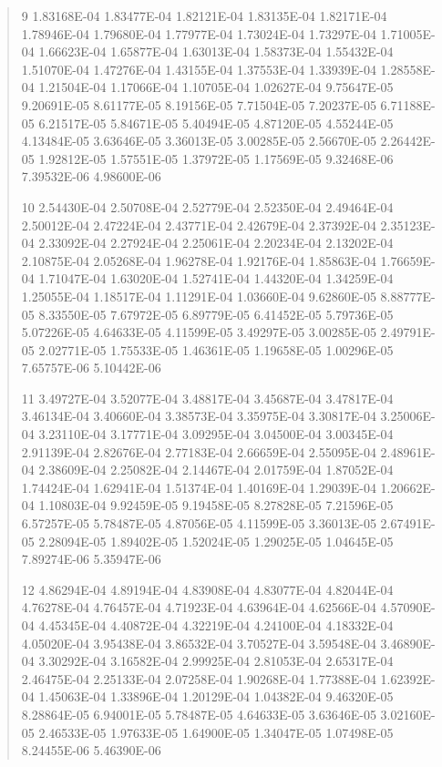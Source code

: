 \documentclass[letterpaper,10pt,english]{sphinxmanual}
\begin{document}
\begin{quote}
\begin{DUlineblock}{0em}
\begin{DUlineblock}{\DUlineblockindent}
\item[] 9   1.83168E-04  1.83477E-04  1.82121E-04  1.83135E-04  1.82171E-04  1.78946E-04  1.79680E-04  1.77977E-04  1.73024E-04  1.73297E-04  1.71005E-04  1.66623E-04  1.65877E-04  1.63013E-04  1.58373E-04  1.55432E-04  1.51070E-04  1.47276E-04  1.43155E-04  1.37553E-04  1.33939E-04  1.28558E-04  1.21504E-04  1.17066E-04  1.10705E-04  1.02627E-04  9.75647E-05  9.20691E-05  8.61177E-05  8.19156E-05  7.71504E-05  7.20237E-05  6.71188E-05  6.21517E-05  5.84671E-05  5.40494E-05  4.87120E-05  4.55244E-05  4.13484E-05  3.63646E-05  3.36013E-05  3.00285E-05  2.56670E-05  2.26442E-05  1.92812E-05  1.57551E-05  1.37972E-05  1.17569E-05  9.32468E-06  7.39532E-06  4.98600E-06
\end{DUlineblock}
\item[] 10   2.54430E-04  2.50708E-04  2.52779E-04  2.52350E-04  2.49464E-04  2.50012E-04  2.47224E-04  2.43771E-04  2.42679E-04  2.37392E-04  2.35123E-04  2.33092E-04  2.27924E-04  2.25061E-04  2.20234E-04  2.13202E-04  2.10875E-04  2.05268E-04  1.96278E-04  1.92176E-04  1.85863E-04  1.76659E-04  1.71047E-04  1.63020E-04  1.52741E-04  1.44320E-04  1.34259E-04  1.25055E-04  1.18517E-04  1.11291E-04  1.03660E-04  9.62860E-05  8.88777E-05  8.33550E-05  7.67972E-05  6.89779E-05  6.41452E-05  5.79736E-05  5.07226E-05  4.64633E-05  4.11599E-05  3.49297E-05  3.00285E-05  2.49791E-05  2.02771E-05  1.75533E-05  1.46361E-05  1.19658E-05  1.00296E-05  7.65757E-06  5.10442E-06
\item[] 11   3.49727E-04  3.52077E-04  3.48817E-04  3.45687E-04  3.47817E-04  3.46134E-04  3.40660E-04  3.38573E-04  3.35975E-04  3.30817E-04  3.25006E-04  3.23110E-04  3.17771E-04  3.09295E-04  3.04500E-04  3.00345E-04  2.91139E-04  2.82676E-04  2.77183E-04  2.66659E-04  2.55095E-04  2.48961E-04  2.38609E-04  2.25082E-04  2.14467E-04  2.01759E-04  1.87052E-04  1.74424E-04  1.62941E-04  1.51374E-04  1.40169E-04  1.29039E-04  1.20662E-04  1.10803E-04  9.92459E-05  9.19458E-05  8.27828E-05  7.21596E-05  6.57257E-05  5.78487E-05  4.87056E-05  4.11599E-05  3.36013E-05  2.67491E-05  2.28094E-05  1.89402E-05  1.52024E-05  1.29025E-05  1.04645E-05  7.89274E-06  5.35947E-06
\item[] 12   4.86294E-04  4.89194E-04  4.83908E-04  4.83077E-04  4.82044E-04  4.76278E-04  4.76457E-04  4.71923E-04  4.63964E-04  4.62566E-04  4.57090E-04  4.45345E-04  4.40872E-04  4.32219E-04  4.24100E-04  4.18332E-04  4.05020E-04  3.95438E-04  3.86532E-04  3.70527E-04  3.59548E-04  3.46890E-04  3.30292E-04  3.16582E-04  2.99925E-04  2.81053E-04  2.65317E-04  2.46475E-04  2.25133E-04  2.07258E-04  1.90268E-04  1.77388E-04  1.62392E-04  1.45063E-04  1.33896E-04  1.20129E-04  1.04382E-04  9.46320E-05  8.28864E-05  6.94001E-05  5.78487E-05  4.64633E-05  3.63646E-05  3.02160E-05  2.46533E-05  1.97633E-05  1.64900E-05  1.34047E-05  1.07498E-05  8.24455E-06  5.46390E-06

\end{DUlineblock}
\end{quote}
\end{document}
